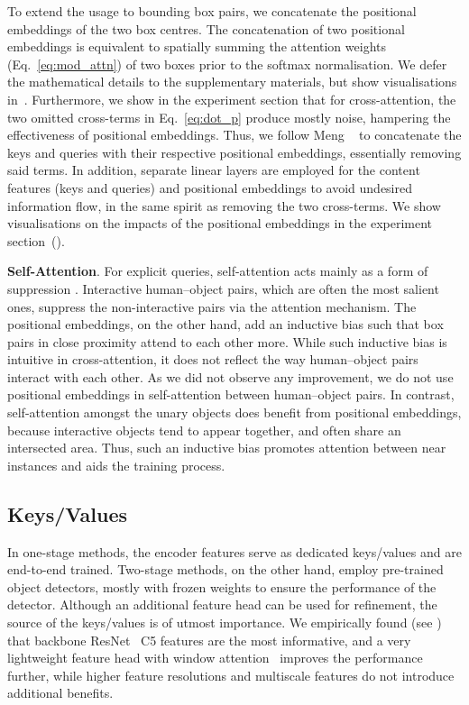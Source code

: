 \documentclass[10pt,twocolumn,letterpaper]{article}
\begin{document}
To extend the usage to bounding box pairs, we concatenate the positional embeddings of the two box centres. The concatenation of two positional embeddings is equivalent to spatially summing the attention weights (Eq.~\ref{eq:mod_attn}) of two boxes prior to the softmax normalisation. We defer the mathematical details to the supplementary materials, but show visualisations in~. Furthermore, we show in the experiment section that for cross-attention, the two omitted cross-terms in Eq.~\ref{eq:dot_p} produce mostly noise, hampering the effectiveness of positional embeddings. Thus, we follow Meng \etal~\cite{cond-detr} to concatenate the keys and queries with their respective positional embeddings, essentially removing said terms. In addition, separate linear layers are employed for the content features (keys and queries) and positional embeddings to avoid undesired information flow, in the same spirit as removing the two cross-terms. We show visualisations on the impacts of the positional embeddings in the experiment section~().

\textbf{Self-Attention}. For explicit queries, self-attention acts mainly as a form of suppression \cite{upt}. Interactive human--object pairs, which are often the most salient ones, suppress the non-interactive pairs via the attention mechanism. The positional embeddings, on the other hand, add an inductive bias such that box pairs in close proximity attend to each other more. While such inductive bias is intuitive in cross-attention, it does not reflect the way human--object pairs interact with each other. As we did not observe any improvement, we do not use positional embeddings in self-attention between human--object pairs. In contrast, self-attention amongst the unary objects does benefit from positional embeddings, because interactive objects tend to appear together, and often share an intersected area. Thus, such an inductive bias promotes attention between near instances and aids the training process.

\subsection{Keys/Values}

In one-stage methods, the encoder features serve as dedicated keys/values and are end-to-end trained. Two-stage methods, on the other hand, employ pre-trained object detectors, mostly with frozen weights to ensure the performance of the detector. Although an additional feature head can be used for refinement, the source of the keys/values is of utmost importance. We empirically found (see ) that backbone ResNet~\cite{resnet} C5 features are the most informative, and a very lightweight feature head with window attention~\cite{swint} improves the performance further, while higher feature resolutions and multiscale features do not introduce additional benefits.
\end{document}
